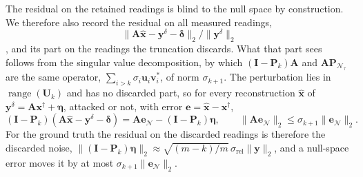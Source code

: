 \documentclass{article}
\numberwithin{equation}{section}
\begin{document}
The residual on the retained readings is blind to the null space by construction. We therefore also
record the residual on all measured readings, \[\lVert\mathbf{A}\hat{\mathbf{x}}-\mathbf{y}^\delta-\boldsymbol{\delta}\rVert_2/\lVert\mathbf{y}^\delta\rVert_2\],
and its part on the readings the truncation discards. What that part sees follows from the singular value
decomposition, by which $(\mathbf{I}-\mathbf{P}_k)\mathbf{A}$ and $\mathbf{A}\mathbf{P}_{\mathcal{N}_\tau}$ are the
same operator, $\sum_{i>k}\sigma_i\mathbf{u}_i\mathbf{v}_i^{*}$, of norm $\sigma_{k+1}$. The perturbation lies in
$\operatorname{range}(\mathbf{U}_k)$ and has no discarded part, so for every reconstruction $\hat{\mathbf{x}}$
of $\mathbf{y}^\delta=\mathbf{A}\mathbf{x}^\dagger+\boldsymbol{\eta}$, attacked or not, with error
$\mathbf{e}=\hat{\mathbf{x}}-\mathbf{x}^\dagger$,
\begin{equation}\label{eq:disc}
(\mathbf{I}-\mathbf{P}_k)(\mathbf{A}\hat{\mathbf{x}}-\mathbf{y}^\delta-\boldsymbol{\delta})
=\mathbf{A}\mathbf{e}_{\mathcal{N}}-(\mathbf{I}-\mathbf{P}_k)\boldsymbol{\eta},
\qquad \lVert\mathbf{A}\mathbf{e}_{\mathcal{N}}\rVert_2\leq\sigma_{k+1}\lVert\mathbf{e}_{\mathcal{N}}\rVert_2 .
\end{equation}
For the ground truth the residual on the discarded readings is therefore the discarded noise,
$\lVert(\mathbf{I}-\mathbf{P}_k)\boldsymbol{\eta}\rVert_2\approx\sqrt{(m-k)/m}\,\sigma_\text{rel}\lVert\mathbf{y}\rVert_2$,
and a null-space error moves it by at most $\sigma_{k+1}\lVert\mathbf{e}_\mathcal{N}\rVert_2$.\\
\end{document}
